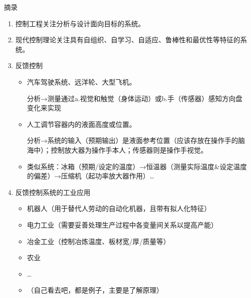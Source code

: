 \documentclass{NHNotebook}
\begin{document}
摘录
\begin{enumerate}
    \item 控制工程关注分析与设计面向目标的系统。
    \item 现代控制理论关注具有自组织、自学习、自适应、鲁棒性和最优性等特征的系统。
    \item 反馈控制
    \begin{itemize}
        \item 汽车驾驶系统、远洋轮、大型飞机。
        
        分析→测量通过a.视觉和触觉（身体运动）或b.手（传感器）感知方向盘变化来实现

        \item 人工调节容器内的液面高度或位置。
        
        分析→系统的输入（预期输出）是液面参考位置（应该存放在操作手的脑海中）；控制放大器为操作手本人；传感器则是操作手视觉。

        \item 类似系统：冰箱（预期/设定的温度）→恒温器（测量实际温度\&设定温度的偏差）→压缩机（起功率放大器作用）\ldots
    \end{itemize}
    \item 反馈控制系统的工业应用
    \begin{itemize}
        \item 机器人（用于替代人劳动的自动化机器，且带有拟人化特征）
        \item 电力工业（需要妥善处理生产过程中各变量间关系以提高产能）
        \item 冶金工业（控制冶炼温度、板材宽/厚/质量等）
        \item 农业
        \item \ldots
        \item （自己看去吧，都是例子，主要是了解原理）
    \end{itemize}
\end{enumerate}
\end{document}
